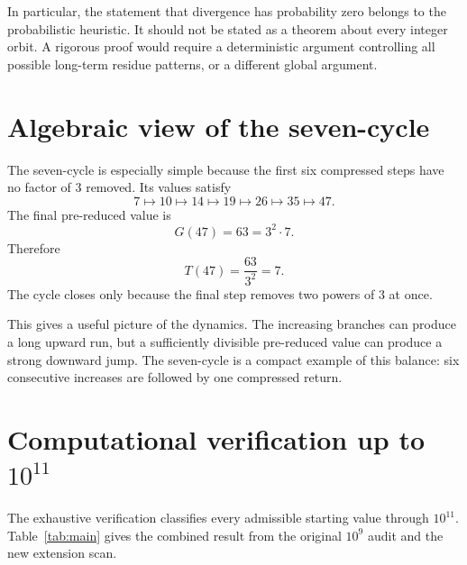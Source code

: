 \documentclass[11pt]{article}
\begin{document}
In particular, the statement that divergence has probability zero belongs to the probabilistic heuristic. It should not be stated as a theorem about every integer orbit. A rigorous proof would require a deterministic argument controlling all possible long-term residue patterns, or a different global argument.

\section{Algebraic view of the seven-cycle}
The seven-cycle is especially simple because the first six compressed steps have no factor of $3$ removed. Its values satisfy
\[
7\mapsto10\mapsto14\mapsto19\mapsto26\mapsto35\mapsto47.
\]
The final pre-reduced value is
\[
G(47)=63=3^2\cdot7.
\]
Therefore
\[
T(47)=\frac{63}{3^2}=7.
\]
The cycle closes only because the final step removes two powers of $3$ at once.

This gives a useful picture of the dynamics. The increasing branches can produce a long upward run, but a sufficiently divisible pre-reduced value can produce a strong downward jump. The seven-cycle is a compact example of this balance: six consecutive increases are followed by one compressed return.

\section{Computational verification up to $10^{11}$}
The exhaustive verification classifies every admissible starting value through $10^{11}$. Table~\ref{tab:main} gives the combined result from the original $10^9$ audit and the new extension scan.
\end{document}

